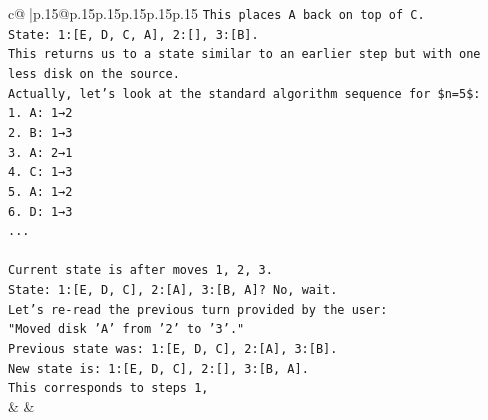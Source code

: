 \documentclass{article}
\begin{document}
{\begin{supertabular}{c@{$\;$}|p{.15\linewidth}@{}p{.15\linewidth}p{.15\linewidth}p{.15\linewidth}p{.15\linewidth}p{.15\linewidth}}
{{{\texttt{This places A back on top of C.} \\
\texttt{State: 1:{[}E, D, C, A{]}, 2:{[}{]}, 3:{[}B{]}.} \\
\texttt{This returns us to a state similar to an earlier step but with one less disk on the source.} \\
\texttt{Actually, let's look at the standard algorithm sequence for \$n=5\$:} \\
\texttt{1. A: 1→2} \\
\texttt{2. B: 1→3} \\
\texttt{3. A: 2→1} \\
\texttt{4. C: 1→3} \\
\texttt{5. A: 1→2} \\
\texttt{6. D: 1→3} \\
\texttt{...} \\
\\ 
\texttt{Current state is after moves 1, 2, 3.} \\
\texttt{State: 1:{[}E, D, C{]}, 2:{[}A{]}, 3:{[}B, A{]}? No, wait.} \\
\texttt{Let's re{-}read the previous turn provided by the user:} \\
\texttt{"Moved disk 'A' from '2' to '3'."} \\
\texttt{Previous state was: 1:{[}E, D, C{]}, 2:{[}A{]}, 3:{[}B{]}.} \\
\texttt{New state is: 1:{[}E, D, C{]}, 2:{[}{]}, 3:{[}B, A{]}.} \\
\texttt{This corresponds to steps 1,} \\
            }
        }
    }
    & & \\ \\


\end{supertabular}}
\end{document}

